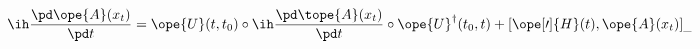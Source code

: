 \begin{equation}	\label{12.63}
\ih \frac{\pd\ope{A}(x_t)}{\pd t}
=
\ope{U}(t,t_0) \circ \ih \frac{\pd\tope{A}(x_t)}{\pd t}\circ
\ope{U}^\dag(t_0,t)
+
[ \ope[\prime]{H}(t),\ope{A}(x_t) ]_{\_}
	\end{equation}

